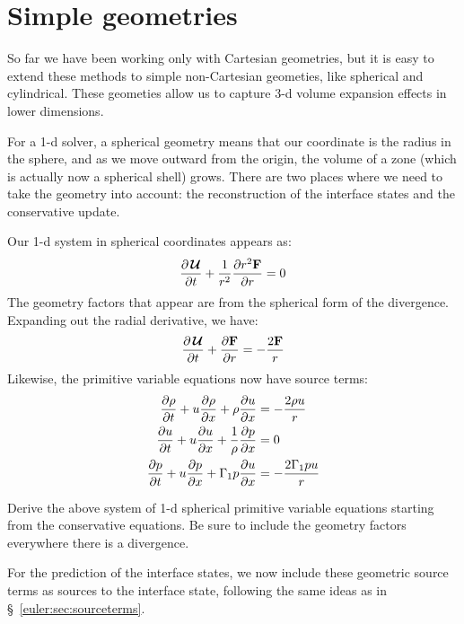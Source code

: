 \section{Simple geometries}

So far we have been working only with Cartesian geometries, but it is
easy to extend these methods to simple non-Cartesian geometies, like
spherical and cylindrical.  These geometies allow us to capture 3-d
volume expansion effects in lower dimensions.

For a 1-d solver, a spherical geometry means that our coordinate is
the radius in the sphere, and as we move outward from the origin, the
volume of a zone (which is actually now a spherical shell) grows.
There are two places where we need to take the geometry into account:
the reconstruction of the interface states and the conservative update.

Our 1-d system in spherical coordinates appears as:
\begin{equation}
{\frac{{\partial{\,\boldsymbol{\mathcal{U}}}}}{\partial t}} + \frac{1}{r^2} {\frac{{\partial r^2 {\bf F}}}{\partial r}} = 0
\end{equation}
The geometry factors that appear are from the spherical form of the
divergence.  Expanding out the radial derivative, we have:
\begin{equation}
{\frac{{\partial{\,\boldsymbol{\mathcal{U}}}}}{\partial t}} + {\frac{{\partial{\bf F}}}{\partial r}} = -\frac{2{\bf F}}{r}
\end{equation}
Likewise, the primitive variable equations now have source terms:
\begin{align}
{\frac{{\partial\rho}}{\partial t}} + u {\frac{{\partial\rho}}{\partial x}} + \rho {\frac{{\partial u}}{\partial x}} &= -\frac{2\rho u}{r} \\
{\frac{{\partial u}}{\partial t}} + u {\frac{{\partial u}}{\partial x}} + \frac{1}{\rho} {\frac{{\partial p}}{\partial x}} &= 0 \\
{\frac{{\partial p}}{\partial t}} + u {\frac{{\partial p}}{\partial x}} + \Gamma_1 p {\frac{{\partial u}}{\partial x}} &= -\frac{2\Gamma_1 p u}{r}
\end{align}

\begin{exercise}
{Derive the above system of 1-d spherical primitive variable equations
  starting from the conservative equations.  Be sure to include the
  geometry factors everywhere there is a divergence.}
\end{exercise}

For the prediction of the interface states, we now include these
geometric source terms as sources to the interface state, following
the same ideas as in \S~\ref{euler:sec:sourceterms}.

